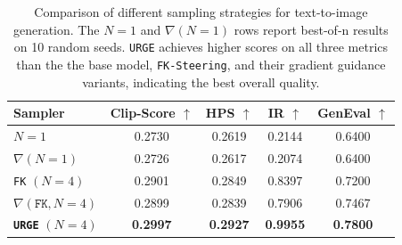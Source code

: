 \documentclass{article}
\theoremstyle{plain}
\theoremstyle{definition}
\theoremstyle{remark}
\begin{document}
\begin{table}[!ht]
    \small
    \centering
    \renewcommand{\arraystretch}{1.15}
    \begin{tabular}{l c c c c}
    \toprule
    \textbf{Sampler} & \textbf{Clip-Score $\uparrow$} & \textbf{HPS $\uparrow$} & \textbf{IR $\uparrow$} & \textbf{GenEval $\uparrow$}\\
    \midrule
    $N = 1$              & 0.2730 & 0.2619 & 0.2144 & 0.6400\\
    $\nabla(N = 1)$      & 0.2726 & 0.2617 & 0.2074 & 0.6400\\
    \texttt{FK} $(N = 4)$         & 0.2901 & 0.2849 & 0.8397 & 0.7200\\
    $\nabla(\texttt{FK}, N = 4)$ & 0.2899 & 0.2839 & 0.7906 & 0.7467\\
    \texttt{\bfseries URGE} $(N = 4)$       & \textbf{0.2997} & \textbf{0.2927} & \textbf{0.9955} & \textbf{0.7800}\\
    \bottomrule
    \end{tabular}
    \caption{Comparison of different sampling strategies for text-to-image generation. The \(N=1\) and \(\nabla(N=1)\) rows report best‑of‑n results on 10 random seeds. \texttt{URGE} achieves higher scores on all three metrics than the the base model, \texttt{FK-Steering}, and their gradient guidance variants, indicating the best overall quality.}
    \vspace{-0.15in}
    \label{overall_test}
\end{table}
\end{document}
